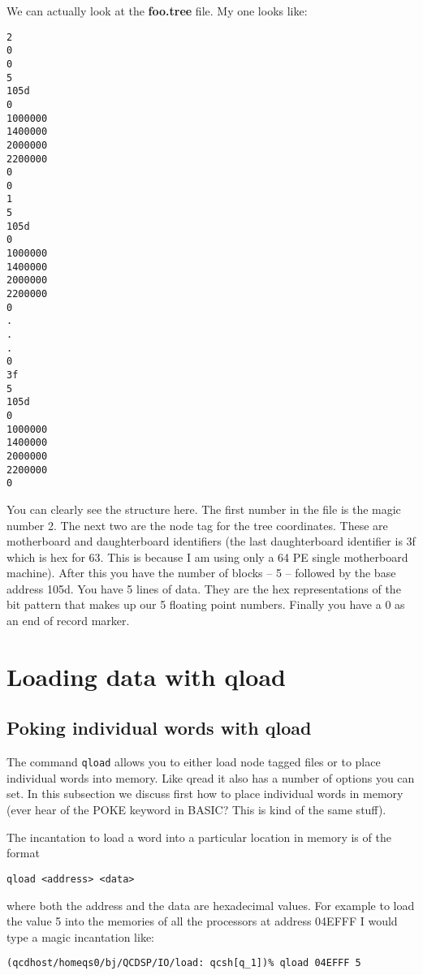 We can actually look at the {\bf foo.tree} file. My one looks like:
{\small
\begin{verbatim}
2
0
0
5
105d
0
1000000
1400000
2000000
2200000
0
0
1
5
105d
0
1000000
1400000
2000000
2200000
0
.
.
.
0
3f
5
105d
0
1000000
1400000
2000000
2200000
0
\end{verbatim}
}

You can clearly see the structure here. The first number in the file
is the magic number 2. The next two are the node tag for the tree
coordinates.  These are motherboard and daughterboard identifiers (the
last daughterboard identifier is 3f which is hex for 63.  This is
because I am using only a 64 PE single motherboard machine).  After
this you have the number of blocks -- 5 -- followed by the base
address 105d. You have 5 lines of data. They are the hex
representations of the bit pattern that makes up our 5 floating point
numbers. Finally you have a 0 as an end of record marker.

\section{Loading data with qload}
\subsection{Poking individual words with qload}
The command {\tt qload} allows you to either load node tagged files or to place
individual words into memory. Like qread it also has a number of options
you can set. In this subsection we discuss first how to place individual 
words in memory (ever hear of the POKE keyword in BASIC? This is kind of
the same stuff).

The incantation to load a word into a particular location in memory is
of the format 
\begin{verbatim}
qload <address> <data>
\end{verbatim}
where both the address and the data are hexadecimal values. For example
to load the value 5 into the memories of all the processors at address
04EFFF I would type a magic incantation like:
\begin{verbatim}
(qcdhost/homeqs0/bj/QCDSP/IO/load: qcsh[q_1])% qload 04EFFF 5
\end{verbatim}

